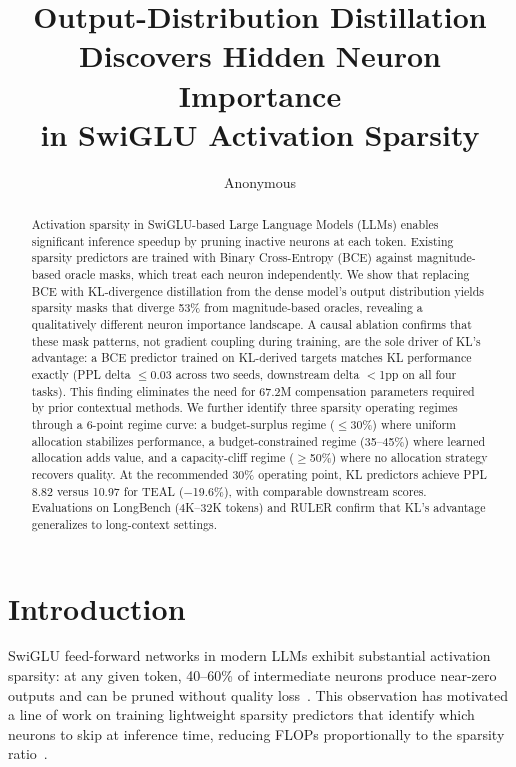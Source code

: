 \documentclass[11pt,a4paper]{article}
\title{Output-Distribution Distillation Discovers Hidden Neuron Importance \\
in SwiGLU Activation Sparsity}
\author{Anonymous}
\date{}
\begin{document}
\maketitle

\begin{abstract}
Activation sparsity in SwiGLU-based Large Language Models (LLMs) enables significant inference speedup by pruning inactive neurons at each token.
Existing sparsity predictors are trained with Binary Cross-Entropy (BCE) against magnitude-based oracle masks, which treat each neuron independently.
We show that replacing BCE with KL-divergence distillation from the dense model's output distribution yields sparsity masks that diverge 53\% from magnitude-based oracles, revealing a qualitatively different neuron importance landscape.
A causal ablation confirms that these mask patterns, not gradient coupling during training, are the sole driver of KL's advantage: a BCE predictor trained on KL-derived targets matches KL performance exactly (PPL delta $\leq$0.03 across two seeds, downstream delta $<$1pp on all four tasks).
This finding eliminates the need for 67.2M compensation parameters required by prior contextual methods.
We further identify three sparsity operating regimes through a 6-point regime curve: a budget-surplus regime ($\leq$30\%) where uniform allocation stabilizes performance, a budget-constrained regime (35--45\%) where learned allocation adds value, and a capacity-cliff regime ($\geq$50\%) where no allocation strategy recovers quality.
At the recommended 30\% operating point, KL predictors achieve PPL 8.82 versus 10.97 for TEAL ($-$19.6\%), with comparable downstream scores.
Evaluations on LongBench (4K--32K tokens) and RULER confirm that KL's advantage generalizes to long-context settings.
\end{abstract}

\section{Introduction}

SwiGLU feed-forward networks in modern LLMs exhibit substantial activation sparsity: at any given token, 40--60\% of intermediate neurons produce near-zero outputs and can be pruned without quality loss~\cite{liu2023deja,song2024prosparse}.
This observation has motivated a line of work on training lightweight sparsity predictors that identify which neurons to skip at inference time, reducing FLOPs proportionally to the sparsity ratio~\cite{lee2024cats,raposo2024mixtureofdepths}.
\end{document}
